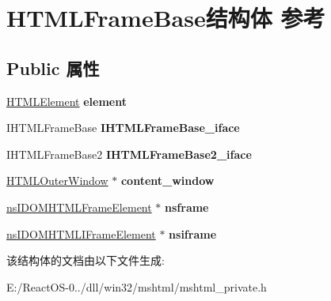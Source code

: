 \hypertarget{struct_h_t_m_l_frame_base}{}\section{H\+T\+M\+L\+Frame\+Base结构体 参考}
\label{struct_h_t_m_l_frame_base}
\subsection*{Public 属性}
\begin{DoxyCompactItemize}
\item 
\mbox{\label{struct_h_t_m_l_frame_base_a3d2ea36d9f92720f23d6450e97539a0a}} 
\hyperlink{struct_h_t_m_l_element}{H\+T\+M\+L\+Element} {\bfseries element}
\item 
\mbox{\label{struct_h_t_m_l_frame_base_a0dcfc00005645fb70460d24f4c13f0b3}} 
I\+H\+T\+M\+L\+Frame\+Base {\bfseries I\+H\+T\+M\+L\+Frame\+Base\+\_\+iface}
\item 
\mbox{\label{struct_h_t_m_l_frame_base_a257879689763466488e17dcefa4e083b}} 
I\+H\+T\+M\+L\+Frame\+Base2 {\bfseries I\+H\+T\+M\+L\+Frame\+Base2\+\_\+iface}
\item 
\mbox{\label{struct_h_t_m_l_frame_base_a8822f55aafbc1cfd2f81a55272e91149}} 
\hyperlink{struct_h_t_m_l_outer_window}{H\+T\+M\+L\+Outer\+Window} $\ast$ {\bfseries content\+\_\+window}
\item 
\mbox{\label{struct_h_t_m_l_frame_base_a4d8590e76cf81a751db90ae3be0cd996}} 
\hyperlink{interfacens_i_d_o_m_h_t_m_l_frame_element}{ns\+I\+D\+O\+M\+H\+T\+M\+L\+Frame\+Element} $\ast$ {\bfseries nsframe}
\item 
\mbox{\label{struct_h_t_m_l_frame_base_a9df2b961d8c2aa85cf8ee7bda1c4a9f8}} 
\hyperlink{interfacens_i_d_o_m_h_t_m_l_i_frame_element}{ns\+I\+D\+O\+M\+H\+T\+M\+L\+I\+Frame\+Element} $\ast$ {\bfseries nsiframe}
\end{DoxyCompactItemize}


该结构体的文档由以下文件生成\+:\begin{DoxyCompactItemize}
\item 
E\+:/\+React\+O\+S-\/0../dll/win32/mshtml/mshtml\+\_\+private.\+h\end{DoxyCompactItemize}
